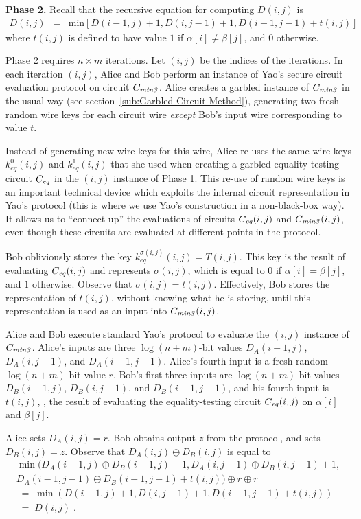 \vspace{1ex}
\noindent
\textbf{Phase 2.}
Recall that the recursive equation for computing $D(i,j)$ is 
\begin{eqnarray*}
D(i,j) & = & \mbox{min} [ D(i-1,j)+1, D(i,j-1)+1, D(i-1,j-1)+t(i,j) ]
\end{eqnarray*}
where $t(i,j)$ is defined to have value $1$ if $\alpha[i] \neq \beta[j]$,
and $0$ otherwise.

Phase 2 requires $n \times m$ iterations.  Let $(i,j)$ be the indices
of the iterations.  In each iteration $(i,j)$, Alice and Bob perform an
instance of Yao's secure circuit evaluation protocol on circuit $C_{\mathit{min3}}$.
Alice creates a garbled instance of $C_{\mathit{min3}}$ in the usual way (see
section~\ref{sub:Garbled-Circuit-Method}), generating two fresh random wire keys for each
circuit wire \emph{except} Bob's input wire corresponding to value $t$.

Instead of generating new wire keys for this wire, Alice re-uses the
same wire keys $k^0_{\mathit{eq}}(i,j)$ and $k^1_{\mathit{eq}}(i,j)$
that she used when creating a garbled equality-testing circuit $C_{\mathit{eq}}$
in the $(i,j)$ instance of Phase 1.  This re-use of random wire keys
is an important technical device which exploits the internal circuit
representation in Yao's protocol (this is where we use Yao's construction
in a non-black-box way).  It allows us to ``connect up'' the evaluations
of circuits $C_{\mathit{eq}}(i,j)$ and $C_{\mathit{min3}}(i,j)$, even though these circuits are
evaluated at different points in the protocol.

Bob obliviously stores the key $k^{\sigma(i,j)}_{\mathit{eq}}(i,j) =
T(i,j)$.  This key is the result of evaluating $C_{\mathit{eq}}(i,j)$ and represents
$\sigma(i,j)$, which is equal to $0$ if $\alpha[i]=\beta[j]$, and $1$
otherwise.  Observe that $\sigma(i,j)=t(i,j)$.  Effectively, Bob stores
the representation of $t(i,j)$, without knowing what he is storing,
until this representation is used as an input into $C_{\mathit{min3}}(i,j)$.

Alice and Bob execute standard Yao's protocol to evaluate the $(i,j)$
instance of $C_{\mathit{min3}}$.  Alice's inputs are three $\log(n+m)$-bit values
$D_A(i-1,j)$, $D_A(i,j-1)$, and $D_A(i-1,j-1)$.  Alice's fourth input is
a fresh random $\log(n+m)$-bit value $r$. Bob's first three inputs are
$\log(n+m)$-bit values $D_B(i-1,j)$, $D_B(i,j-1)$, and $D_B(i-1,j-1)$,
and his fourth input is $t(i,j)$, \ie, the result of evaluating the
equality-testing circuit $C_{\mathit{eq}}(i,j)$ on $\alpha[i]$ and $\beta[j]$.

Alice sets $D_A(i,j)=r$.  Bob obtains output $z$ from the protocol,
and sets $D_B(i,j)=z$.  Observe that $D_A (i,j) \oplus D_B (i,j)$ is equal to
\[
\begin{array}{l}
\min( D_A(i-1,j) \oplus D_B(i-1,j) + 1, D_A(i,j-1) \oplus D_B(i,j-1) +1 , \\ 
       D_A(i-1,j-1) \oplus D_B(i-1,j-1) + t(i,j) ) \oplus r \oplus r \\ 
\; = \; \min( D(i-1,j)+1, D(i,j-1)+1,D(i-1,j-1)+t(i,j)) \\
\; = \; D(i,j) \;.
\end{array}
\]

